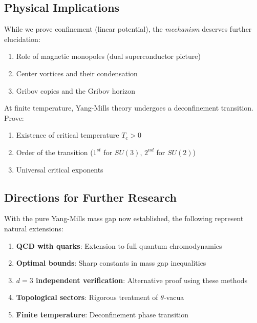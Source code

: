 \subsection{Physical Implications}

\begin{problem}
While we prove confinement (linear potential), the \emph{mechanism} 
deserves further elucidation:
\begin{enumerate}[label=(\roman*)]
\item Role of magnetic monopoles (dual superconductor picture)
\item Center vortices and their condensation
\item Gribov copies and the Gribov horizon
\end{enumerate}
\end{problem}

\begin{problem}
At finite temperature, Yang-Mills theory undergoes a deconfinement transition. 
Prove:
\begin{enumerate}[label=(\alph*)]
\item Existence of critical temperature $T_c > 0$
\item Order of the transition ($1^{st}$ for $SU(3)$, $2^{nd}$ for $SU(2)$)
\item Universal critical exponents
\end{enumerate}
\end{problem}

\subsection{Directions for Further Research}

With the pure Yang-Mills mass gap now established, the following represent 
natural extensions:

\begin{enumerate}
\item \textbf{QCD with quarks}: Extension to full quantum chromodynamics
\item \textbf{Optimal bounds}: Sharp constants in mass gap inequalities
\item \textbf{$d = 3$ independent verification}: Alternative proof using these methods
\item \textbf{Topological sectors}: Rigorous treatment of $\theta$-vacua
\item \textbf{Finite temperature}: Deconfinement phase transition
\end{enumerate}

